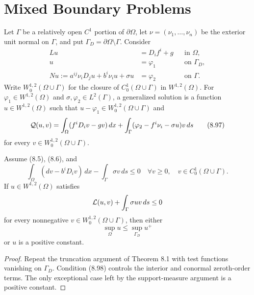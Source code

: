 \section*{Mixed Boundary Problems}

\begin{definition}
\label{gt-def-8-generalized-mixed-boundary-problem}
Let $\Gamma$ be a relatively open $C^1$ portion of $\partial\Omega$, let
$\nu=(\nu_1,\ldots,\nu_n)$ be the exterior unit normal on $\Gamma$, and put
$\Gamma_D=\partial\Omega\setminus\Gamma$. Consider
\begin{equation}
\begin{aligned}
Lu&=D_if^i+g &&\text{in }\Omega,\\
u&=\varphi_1 &&\text{on }\Gamma_D,\\
Nu:=a^{ij}\nu_iD_ju+b^i\nu_i u+\sigma u&=\varphi_2
&&\text{on }\Gamma.
\end{aligned}
\tag{8.96}
\end{equation}
Write $W_0^{1,2}(\Omega\cup\Gamma)$ for the closure of
$C_0^1(\Omega\cup\Gamma)$ in $W^{1,2}(\Omega)$. For
$\varphi_1\in W^{1,2}(\Omega)$ and $\sigma,\varphi_2\in L^2(\Gamma)$, a
generalized solution is a function $u\in W^{1,2}(\Omega)$ such that
$u-\varphi_1\in W_0^{1,2}(\Omega\cup\Gamma)$ and
\begin{equation}
\mathcal{Q}(u,v)=\int_\Omega(f^iD_iv-gv)\,dx
+\int_\Gamma(\varphi_2-f^i\nu_i-\sigma u)v\,ds
\tag{8.97}
\end{equation}
for every $v\in W_0^{1,2}(\Omega\cup\Gamma)$.
\end{definition}

\begin{theorem}
\label{gt-thm-8-mixed-boundary-maximum-principle}
Assume (8.5), (8.6), and
\begin{equation}
\int_\Omega(dv-b^iD_iv)\,dx-\int_\Gamma\sigma v\,ds\leq0
\quad\forall v\geq0,\quad v\in C_0^1(\Omega\cup\Gamma).
\tag{8.98}
\end{equation}
If $u\in W^{1,2}(\Omega)$ satisfies
\[
\mathcal{L}(u,v)+\int_\Gamma\sigma uv\,ds\leq0
\]
for every nonnegative $v\in W_0^{1,2}(\Omega\cup\Gamma)$, then either
\[
\sup_\Omega u\leq\sup_{\Gamma_D}u^+
\]
or $u$ is a positive constant.
\end{theorem}
\begin{proof}
\sketch Repeat the truncation argument of Theorem 8.1 with test functions
vanishing on $\Gamma_D$. Condition (8.98) controls the interior and conormal
zeroth-order terms. The only exceptional case left by the support-measure
argument is a positive constant.
\end{proof}


